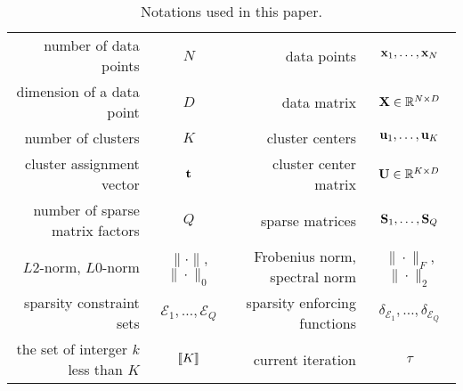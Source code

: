 

\begin{table}[t]
	\centering
	\begin{tabular}{|r|c||r|c|}
		\hline
			number of data points & $N$ & data points  & ${\mathbf{x}}_1,\ldots, {\mathbf{x}}_N $  \\
			dimension of a data point & $D$ & data matrix  & $ {\mathbf{X}} \in\mathbb{R}^{N\times D}$  \\
				number of clusters & $K$ &  cluster centers   & ${\mathbf{u}}_1,\ldots, {\mathbf{u}}_K $  \\
			cluster assignment vector & ${\mathbf{t}}$ & cluster center matrix & ${\mathbf{U}}\in\mathbb{R}^{K\times D}$ \\
				number of sparse matrix factors& $Q$ & sparse matrices & ${\mathbf{S}}_1, \ldots, {\mathbf{S}}_Q$ \\
			$L2$-norm, $L0$-norm& $\|\cdot\|$, $\|\cdot\|_0$ & Frobenius norm, 	spectral norm & $\|\cdot\|_F$, $\|\cdot\|_2$ \\
		sparsity constraint sets & $\mathcal{E}_1, \ldots, \mathcal{E}_Q$  & sparsity enforcing functions & $\delta_{\mathcal{E}_1},\ldots,\delta_{\mathcal{E}_Q}$  \\
		the set of interger $k$ less than $K$& $\left \llbracket K\right \rrbracket$ & current iteration & $\tau$   \\
		\hline
	\end{tabular}
	\caption{Notations used in this paper.}
	\label{tab:notation}
\end{table}
\addtocounter{footnote}{0}






